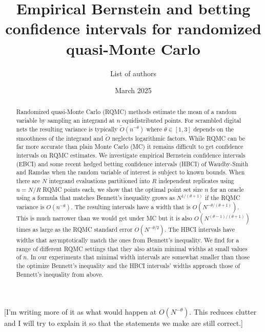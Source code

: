 \documentclass{article}
\title{Empirical Bernstein and betting confidence intervals for randomized quasi-Monte Carlo}
\date{March 2025}
\author{List of authors}
\newcommand{\art}[1]{\begingroup\color{blue}#1\endgroup}
\newcommand{\aadit}[1]{\begingroup\color{orange}#1\endgroup}
\begin{document}
\maketitle
\begin{abstract}
Randomized quasi-Monte Carlo (RQMC) methods estimate the mean of a random
variable by sampling an integrand
at $n$ equidistributed points. For scrambled digital nets 
the resulting variance is typically $\tilde O(n^{-\theta})$ 
where $\theta\in[1,3]$ depends on the smoothness of the
integrand and $\tilde O$ neglects logarithmic factors.
While RQMC can be far more accurate than plain Monte Carlo (MC)
it remains difficult to get confidence intervals on RQMC
estimates.  We investigate empirical Bernstein confidence intervals (EBCI) and
some recent hedged betting confidence intervals (HBCI) of Waudby-Smith and Ramdas
when the random variable of interest is subject to known bounds.
When there are $N$ integrand evaluations
partitioned into $R$ independent replicates using $n=N/R$
RQMC points each, we show that the optimal point set size $n$ 
for an oracle using a formula that matches Bennett's inequality
grows as $N^{1/(\theta+1)}$ if the RQMC variance is $O(n^{-\theta})$.
The resulting intervals have
a width that is $O(N^{-\theta/(\theta+1)})$. 
This is  much narrower
than we would get under MC
but it is also $O(N^{(\theta - 1)/(\theta+1)})$ times as
large as the RQMC standard error $O(N^{-\theta/2})$.
The HBCI intervals have widths that asymptotically match the
ones from Bennett's inequality. We find for a range of different
RQMC settings that they also attain minimal widths at
small values of $n$. In our experiments that minimal width
intervals are somewhat smaller than those the optimize
Bennett's inequality and the HBCI intervals' widths
approach those of Bennett's inequality from above.
\end{abstract}

\art{[I'm writing more of it as what would
happen at $O(N^{-\theta})$. This reduces clutter and I
will try to explain it so that the statements
we make are still correct.]}



\end{document}
